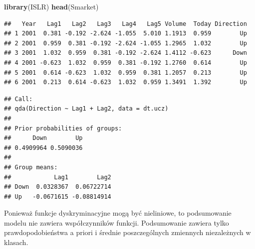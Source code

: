 \documentclass[
]{book}
\newenvironment{Shaded}{\begin{snugshade}}{\end{snugshade}}
\newcommand{\DataTypeTok}[1]{\textcolor[rgb]{0.13,0.29,0.53}{#1}}
\newcommand{\DecValTok}[1]{\textcolor[rgb]{0.00,0.00,0.81}{#1}}
\newcommand{\KeywordTok}[1]{\textcolor[rgb]{0.13,0.29,0.53}{\textbf{#1}}}
\newcommand{\NormalTok}[1]{#1}
\newcommand{\OperatorTok}[1]{\textcolor[rgb]{0.81,0.36,0.00}{\textbf{#1}}}
\newcommand{\StringTok}[1]{\textcolor[rgb]{0.31,0.60,0.02}{#1}}
\theoremstyle{plain}
\theoremstyle{definition}
\theoremstyle{definition}
\theoremstyle{definition}
\theoremstyle{definition}
\theoremstyle{remark}
\begin{document}
\begin{Shaded}
\begin{Highlighting}[]
\KeywordTok{library}\NormalTok{(ISLR)}
\KeywordTok{head}\NormalTok{(Smarket)}
\end{Highlighting}
\end{Shaded}

\begin{verbatim}
##   Year   Lag1   Lag2   Lag3   Lag4   Lag5 Volume  Today Direction
## 1 2001  0.381 -0.192 -2.624 -1.055  5.010 1.1913  0.959        Up
## 2 2001  0.959  0.381 -0.192 -2.624 -1.055 1.2965  1.032        Up
## 3 2001  1.032  0.959  0.381 -0.192 -2.624 1.4112 -0.623      Down
## 4 2001 -0.623  1.032  0.959  0.381 -0.192 1.2760  0.614        Up
## 5 2001  0.614 -0.623  1.032  0.959  0.381 1.2057  0.213        Up
## 6 2001  0.213  0.614 -0.623  1.032  0.959 1.3491  1.392        Up
\end{verbatim}

\begin{Shaded}
\end{Shaded}

\begin{verbatim}
## Call:
## qda(Direction ~ Lag1 + Lag2, data = dt.ucz)
## 
## Prior probabilities of groups:
##      Down        Up 
## 0.4909964 0.5090036 
## 
## Group means:
##            Lag1        Lag2
## Down  0.0328367  0.06722714
## Up   -0.0671615 -0.08814914
\end{verbatim}

Ponieważ funkcje dyskryminacyjne mogą być nieliniowe, to podsumowanie modelu nie zawiera współczynników funkcji. Podsumowanie zawiera tylko prawdopodobieństwa a priori i średnie poszczególnych zmiennych niezależnych w klasach.
\end{document}

